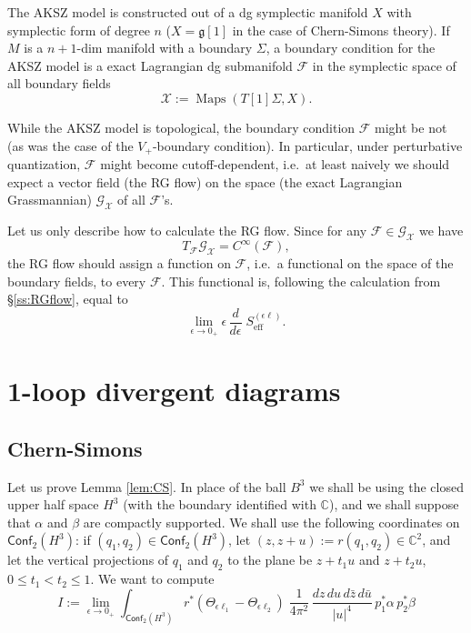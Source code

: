 \documentclass[a4paper]{amsart}
\theoremstyle{plain}
\theoremstyle{definition}
\newcommand{\mc}{\mathcal}
\newcommand{\on}{\operatorname}
\newcommand{\g}{\mathfrak{g}}
\newcommand{\C}{\mathbb{C}}
\newcommand{\cf}{\mathsf{Conf}}
\begin{document}
The AKSZ model is constructed out of a dg symplectic manifold $X$ with symplectic form of degree $n$ ($X=\g[1]$ in the case of Chern-Simons theory). If $M$ is a $n+1$-dim manifold with a boundary $\Sigma$, a boundary condition for the AKSZ model is a  exact Lagrangian dg submanifold $\mc F$ in the symplectic space of all boundary fields
$$\mc X:=\on{Maps}(T[1]\Sigma,X).$$

While the AKSZ model is topological, the boundary condition $\mc F$ might be not (as was the case of the $V_+$-boundary condition). In particular, under perturbative quantization, $\mc F$ might become cutoff-dependent, i.e.\ at least naively we should expect a vector field (the RG flow) on the space (the exact Lagrangian Grassmannian) $\mc{G}_\mc X$ of all $\mc F$'s.

Let us only describe how to calculate the RG flow.
Since for any $\mc F\in\mc{G}_\mc X$ we have
$$T_\mc F \mc{G}_\mc X =C^\infty(\mc F), $$
the RG flow should assign a function on $\mc F$, i.e.\ a functional on the space of the boundary fields, to every $\mc F$. This functional is, following the calculation from \S\ref{ss:RGflow}, equal to
\begin{equation}\label{akszrg}
\lim_{\epsilon\to0_+} \epsilon\,\frac d{d\epsilon}\; S_\text{eff}^{(\epsilon\ell)}.
\end{equation}



\appendix

\section{1-loop divergent diagrams}
\subsection{Chern-Simons}
Let us prove Lemma \ref{lem:CS}. In place of the ball $B^3$ we shall be using the closed upper half space $H^3$ (with the boundary identified with $\C$), and we shall suppose that $\alpha$ and $\beta$ are compactly supported. We shall use the following coordinates on $\cf_2(H^3)$: if $(q_1,q_2)\in\cf_2(H^3)$, let $(z,z+u):=r(q_1,q_2)\in\C^2$, and let the vertical projections of $q_1$ and $q_2$ to the plane be $z+t_1u$ and $z+t_2u$, $0\leq t_1<t_2\leq1$. We want to compute
$$I:=
\lim_{\epsilon\to0_+}\int_{\cf_2(H^3)}r^*(\Theta_{\epsilon\ell_1}-\Theta_{\epsilon\ell_2})\;\frac1{4\pi^2}\,\frac{dz\,du\,d\bar z\,d\bar u}{|u|^4}\,p_1^*\alpha\, p_2^*\beta
$$
\end{document}
